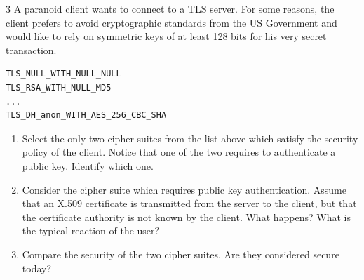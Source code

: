 \documentclass[]{scrartcl}
\newcounter{exercise}
\newcounter{qid}[section]
\newcommand{\exerciseprefix}{prefix}
\newcommand{\questiontitle}{Questions}
\newcommand{\blockid}{B4}
\newcommand{\exname}{}
\begin{document}
\renewcommand{\exerciseprefix}{PS-\blockid{}-E\theexercise: \exname{}-Q\theqid}
\renewcommand{\questiontitle}{\exerciseprefix{}: TLS Cipher Suites}
\begin{exercisebox}{3}
A paranoid client wants to connect to a TLS server. For some reasons, the client prefers to avoid cryptographic standards from
the US Government and would like to rely on symmetric keys of at least 128 bits for his very secret transaction.
\begin{verbatim}
TLS_NULL_WITH_NULL_NULL
TLS_RSA_WITH_NULL_MD5
...
TLS_DH_anon_WITH_AES_256_CBC_SHA
\end{verbatim}
\begin{enumerate}
    \item Select the only two cipher suites from the list above which satisfy the security policy of the client. Notice that one of the two requires to authenticate a public key. Identify which one.
    \item Consider the cipher suite which requires public key authentication. Assume that an X.509 certificate is transmitted from the server to the client, but that the certificate authority is not known by the client. What happens? What is the typical reaction of the user?
    \item Compare the security of the two cipher suites. Are they considered secure today?
\end{enumerate}
\end{exercisebox}
\end{document}
